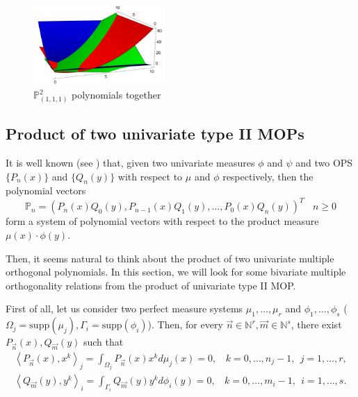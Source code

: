 \documentclass[12pt,a4]{report}
\theoremstyle{plain}
\newcommand{\N}[0]{\mathbb{N}}
\newcommand{\supp}[0]{\mathrm{supp}}
\newcommand{\prodesc}[2]{\left\langle #1 , #2 \right\rangle}
\begin{document}
  \begin{figure}[h]
    \centering\includegraphics[width=5cm]{./img/EjemploLaguerre.png}
    \caption{$\mathbb P_{(1,1,1)}^2$ polynomials together}
    \label{fig:example-2}
  \end{figure}

  \subsection{Product of two univariate type II MOPs}

  It is well known (see \cite[Ch. II, Section 2.2]{dunkl_xu_2014}) that, given two univariate measures $\phi$ and $\psi$ and two OPS $\{P_n(x)\}$ and $\{Q_n(y)\}$ with respect to $\mu$ and $\phi$ respectively, then the polynomial vectors 
  $$
  \mathbb P_n = \left(P_n(x) Q_0(y), P_{n-1}(x)Q_1(y),\dots,P_0(x) Q_n(y)\right)^T \ \ \ \ n\geq 0
  $$
  form a system of polynomial vectors with respect to the product measure $\mu(x)\cdot \phi(y)$.
  
  Then, it seems natural to think about the product of two univariate multiple orthogonal polynomials. In this section, we will look for some bivariate multiple orthogonality relations from the product of univariate type II MOP. 
  
  First of all, let us consider two perfect measure systems $\mu_1,\dots,\mu_r$ and $\phi_1,\dots,\phi_s$ ($\Omega_j = \supp(\mu_j), \Gamma_i = \supp(\phi_i)$). Then, for every $\vec n\in \N^r, \vec m\in\N^s$, there exist $P_{\vec n}(x), Q_{\vec m}(y)$ such that
  \begin{eqnarray}
      \prodesc{P_{\vec n}(x)}{x^k}_j = \int_{\Omega_j}P_{\vec n}(x) x^k d\mu_j(x) = 0, \ \ \ \ k=0,\dots,n_j-1, \ \ j=1,\dots,r,   \\
      \prodesc{Q_{\vec m}(y)}{y^k}_i = \int_{\Gamma_i}Q_{\vec m}(y) y^k d\phi_i(y) = 0, \ \ \ \ k=0,\dots,m_i-1, \ \ i=1,\dots,s.
  \end{eqnarray}
\end{document}
